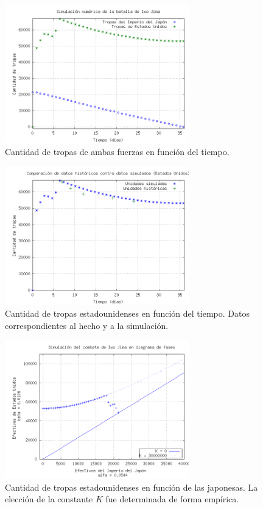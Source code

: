 \documentclass{sig-alternate}
\begin{document}
\begin{figure}[h]
\begin{center}
\includegraphics[width=8cm]{jap_vs_usa.png}
\caption{\label{fig:trays}Cantidad de tropas de ambas fuerzas en función del tiempo.}
\end{center}
\end{figure}

\begin{figure}[h]
\begin{center}
\includegraphics[width=8cm]{real_vs_sim.png}
\caption{\label{fig:realvssim}Cantidad de tropas estadounidenses en función del tiempo. Datos correspondientes al hecho y a la simulación.}
\end{center}
\end{figure}

\begin{figure}[h]
\begin{center}
\includegraphics[width=8cm]{power_area_iwo_jima.png}
\caption{\label{fig:xvsy}Cantidad de tropas estadounidenses en función de las japonesas. La elección de la constante $K$ fue determinada de forma empírica.}
\end{center}
\end{figure}
\end{document}
